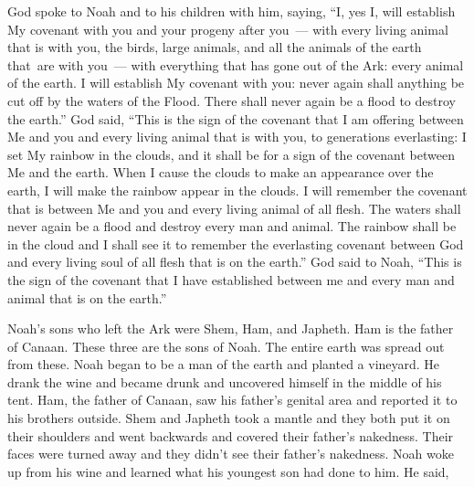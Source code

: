 \begin{inparaenum}
     God spoke to Noah and to his children with him, saying,%
     ``I, yes I, will establish My covenant with you and your progeny after you~---%
     with every living animal that is with you, the birds, large animals, and all the animals of the earth that\understood\ are with you~--- with everything that has gone out of the Ark: every animal of the earth.%
     I will establish My covenant with you: never again shall anything be cut off by the waters of the Flood. There shall never again be a flood to destroy the earth.''%
     God said, ``This is the sign of the covenant that I am offering between Me and you and every living animal that is with you, to generations everlasting:%
     I set My rainbow in the clouds, and it shall be for a sign of the covenant between Me and the earth.%
     When I cause the clouds to make an appearance over the earth, I will make the rainbow appear in the clouds.%
     I will remember the covenant that is between Me and you and every living animal of all flesh. The waters shall never again be a flood and destroy every man and animal.%
     The rainbow shall be in the cloud and I shall see it to remember the everlasting covenant between God and every living soul of all flesh that is on the earth.''%
     God said to Noah, ``This is the sign of the covenant that I have established between me and every man and animal that is on the earth.''%
    
     Noah's sons who left the Ark were Shem, Ham, and Japheth. Ham is the father of Canaan.%
     These three are the sons of Noah. The entire earth was spread out from these.%
     Noah began to be a man of the earth and planted a vineyard.%
     He drank the wine and became drunk and uncovered himself in the middle of his tent.%
     Ham, the father of Canaan, saw his father's genital area and reported it to his brothers outside.%
     Shem and Japheth took a mantle and they both put it on their shoulders and went backwards and covered their father's nakedness. Their faces were turned away and they didn't see their father's nakedness.%
     Noah woke up from his wine and learned what his youngest son had done to him.%
     He said,%
    

\end{inparaenum}
